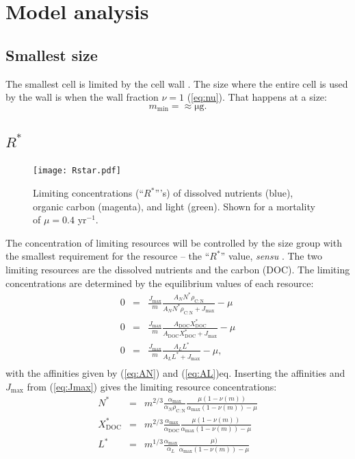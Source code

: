 \documentclass[11pt]{article}
\newcommand{\Jmax}[1][]{J_\mathrm{max}#1}
\newcommand{\DOC}{\mathrm{DOC}}
\newcommand{\rCN}{\rho_\mathrm{C:N}}
\begin{document}
\section{Model analysis}

\subsection{Smallest size}
The smallest cell is limited by the cell wall \citep{Raven1994}.  The size where the entire cell is used by the wall is when the wall fraction $\nu = 1$ (\ref{eq:nu}).  That happens at a size:
\begin{equation}
  \label{eq:12}
  m_\mathrm{min} =  \approx \mathrm{\mu g}.
\end{equation}


\subsection*{$R^*$}
\begin{figure}[t]
  \centering
  \texttt{[image: Rstar.pdf]}
  \caption{Limiting concentrations (``$R^*$'''s) of dissolved nutrients (blue), organic carbon (magenta), and light (green).  Shown for a mortality of $\mu = 0.4$ yr$^{-1}$.}
  \label{fig:Rstar}
\end{figure}

The concentration of limiting resources will be controlled by the size group with the smallest requirement for the resource -- the ``$R^*$'' value, \emph{sensu} \citet{Tilman1982}.  The two limiting resources are the dissolved nutrients and the carbon (DOC).  The limiting concentrations are determined by the equilibrium values of each resource:
\begin{eqnarray}
  \label{eq:Rstar}
  0 &=& \frac{\Jmax}{m} \frac{A_N N^* \rCN }{A_N N^* \rCN + \Jmax} - \mu \\ 
  0 &=& \frac{\Jmax}{m} \frac{A_\DOC X_\DOC^* }{A_\DOC X_\DOC^* + \Jmax} - \mu \\
  0 &=& \frac{\Jmax}{m} \frac{A_L L^* }{A_L L^* + \Jmax} - \mu, \\
\end{eqnarray}
with the affinities given by (\ref{eq:AN}) and (\ref{eq:AL})eq.  Inserting the affinities and $\Jmax$ from (\ref{eq:Jmax}) gives the limiting resource concentrations:
\begin{eqnarray}
  \label{eq:Rstars}
  N^*  &=& m^{2/3} \frac{\alpha_\mathrm{max}}{\alpha_N \rCN} \frac{\mu(1-\nu(m))}{\alpha_\mathrm{max} (1-\nu(m)) - \mu} \\
  X_\DOC^* &=& m^{2/3} \frac{\alpha_\mathrm{max}}{\alpha_\DOC } \frac{\mu(1-\nu(m))}{\alpha_\mathrm{max} (1-\nu(m)) - \mu} \\
  L^* &=& m^{1/3} \frac{\alpha_\mathrm{max}}{\alpha_L } \frac{\mu)}{\alpha_\mathrm{max} (1-\nu(m)) - \mu} 
\end{eqnarray}
\end{document}
